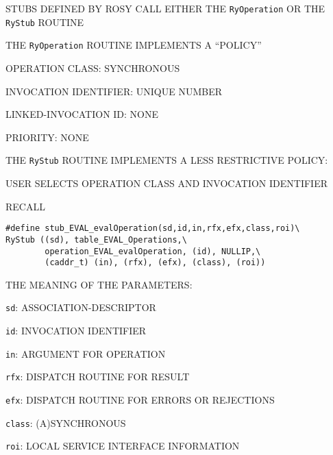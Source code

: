 \begin{bwslide}

\begin{nrtc}
\item	STUBS DEFINED BY ROSY CALL EITHER THE \verb"RyOperation" OR THE
	\verb"RyStub" ROUTINE

\item	THE \verb"RyOperation" ROUTINE IMPLEMENTS A ``POLICY''
    \begin{nrtc}
    \item	OPERATION CLASS: SYNCHRONOUS

    \item	INVOCATION IDENTIFIER: UNIQUE NUMBER

    \item	LINKED-INVOCATION ID: NONE

    \item	PRIORITY: NONE
    \end{nrtc}

\item	THE \verb"RyStub" ROUTINE IMPLEMENTS A LESS RESTRICTIVE POLICY:
    \begin{nrtc}
    \item	USER SELECTS OPERATION CLASS AND INVOCATION IDENTIFIER
    \end{nrtc}
\end{nrtc}
\end{bwslide}


\begin{bwslide}

\begin{nrtc}
\item	RECALL
{\small
\begin{verbatim}
#define stub_EVAL_evalOperation(sd,id,in,rfx,efx,class,roi)\
RyStub ((sd), table_EVAL_Operations,\
        operation_EVAL_evalOperation, (id), NULLIP,\
        (caddr_t) (in), (rfx), (efx), (class), (roi))
\end{verbatim}}

\item	THE MEANING OF THE PARAMETERS:
    \begin{nrtc}
    \item	\verb"sd": ASSOCIATION-DESCRIPTOR

    \item	\verb"id": INVOCATION IDENTIFIER

    \item	\verb"in": ARGUMENT FOR OPERATION

    \item	\verb"rfx": DISPATCH ROUTINE FOR RESULT

    \item	\verb"efx": DISPATCH ROUTINE FOR ERRORS OR REJECTIONS

    \item	\verb"class": (A)SYNCHRONOUS

    \item	\verb"roi": LOCAL SERVICE INTERFACE INFORMATION
    \end{nrtc}
\end{nrtc}
\end{bwslide}


